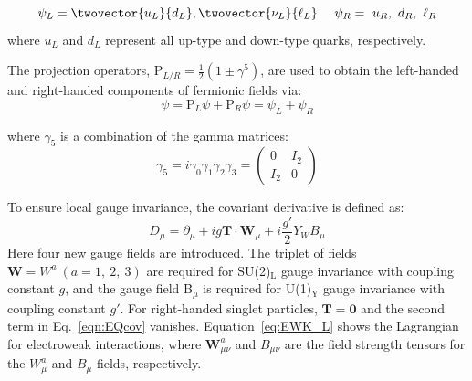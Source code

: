 \begin{equation*}
\psi_L = \twovector{u_L}{d_L}, \twovector{\nu_L}{\ell_L}~~~~\psi_R=~u_R,~d_R,~\ell_R
\end{equation*}
where $u_L$ and $d_L$ represent all up-type and down-type quarks, respectively.

The projection operators, $\textrm{P}_{L/R}=\frac{1}{2}(1\pm\gamma^{5})$, are used to obtain the left-handed and right-handed components of fermionic fields via:
\begin{equation}
\psi = \textrm{P}_{L}\psi + \textrm{P}_{R}\psi = \psi_{L} + \psi_{R}
\end{equation}

where $\gamma_{5}$ is a combination of the gamma matrices:
\begin{equation}
\gamma_{5} = i\gamma_{0}\gamma_{1}\gamma_{2}\gamma_{3} = 
{\begin{pmatrix}
0&I_{2}\\
I_{2}&0
\end{pmatrix}}
\end{equation}

To ensure local gauge invariance, the covariant derivative is defined as:
\begin{equation}
D_{\mu} = \partial_\mu  + i g \mathbf{T} \cdot \mathbf{W}_{\mu} + i \frac{g'}{2} Y_{W} B_\mu
\label{eqn:EQcov}
\end{equation}
Here four new gauge fields are introduced. The triplet of fields $\mathbf{W} = W^{a}~(a=1,~2,~3)$ are required for SU(2)$_{\textrm{L}}$ gauge invariance with coupling constant $g$, and the gauge field B$_{\mu}$ is required for U(1)$_{\textrm{Y}}$ gauge invariance with coupling constant $g'$. For right-handed singlet particles, $\mathbf{T}=\mathbf{0}$ and the second term in Eq.~\ref{eqn:EQcov} vanishes.
Equation~\ref{eq:EWK_L} shows the Lagrangian for electroweak interactions, where $\mathbf{W}_{\mu\nu}^{a}$ and $B_{\mu\nu}$ are the field strength tensors for the  $W^{a}_{\mu}$ and $B_{\mu}$ fields, respectively.

